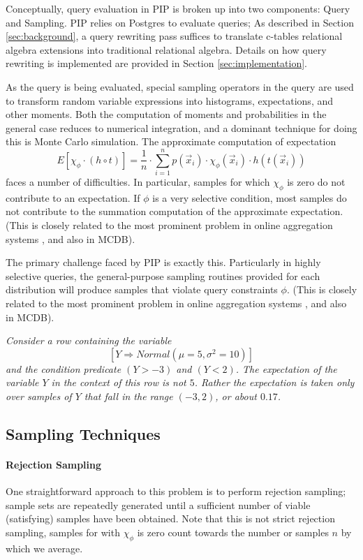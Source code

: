 Conceptually, query evaluation in PIP is broken up into two components: Query and Sampling.  PIP relies on Postgres to evaluate queries; As described in Section \ref{sec:background}, a query rewriting pass suffices to translate c-tables relational algebra extensions into traditional relational algebra.  Details on how query rewriting is implemented are provided in Section \ref{sec:implementation}.  

As the query is being evaluated, special sampling operators in the query are used to transform random variable expressions into histograms, expectations, and other moments.  Both the computation of moments and probabilities in the general case reduces to numerical integration, and a dominant technique for doing this is Monte Carlo simulation. The approximate computation of expectation
\begin{equation}
E[\chi_\phi \cdot (h \circ t)] =
\frac{1}{n} \cdot \sum_{i=1}^n p(\vec{x}_i) \cdot \chi_\phi(\vec{x}_i) \cdot
h(t(\vec{x}_i))
\end{equation}
faces a number of difficulties.  In particular, samples for which $\chi_{\phi}$ is zero do not contribute to an expectation.  If $\phi$ is a very selective condition, most samples do not contribute to the summation computation of the approximate expectation.  (This is closely related to the most prominent problem in online aggregation systems \cite{OnlineAggregation,DBO}, and also in MCDB).

The primary challenge faced by PIP is exactly this. Particularly in highly selective queries, the general-purpose sampling routines provided for each distribution will produce samples that violate query constraints $\phi$.  (This is closely related to the most prominent problem in online aggregation systems \cite{OnlineAggregation,DBO}, and also in MCDB).

\begin{example}\em 
Consider a row containing the variable 
$$[Y \Rightarrow Normal(\mu=5,\sigma^2=10)]$$
and the condition predicate $(Y > -3)$ and $(Y < 2)$.  The expectation of the variable $Y$ in the context of this row is not $5$.  Rather the expectation is taken only over samples of $Y$ that fall in the range $(-3,2)$, or about $0.17$.  
\end{example}

\subsection{Sampling Techniques}
\paragraph{Rejection Sampling}
One straightforward approach to this problem is to perform rejection sampling; sample sets are repeatedly generated until a sufficient number of viable (satisfying) samples have been obtained.  Note that this is not strict rejection sampling, samples for with $\chi_{\phi}$ is zero count towards the number or samples $n$ by which we average.  

